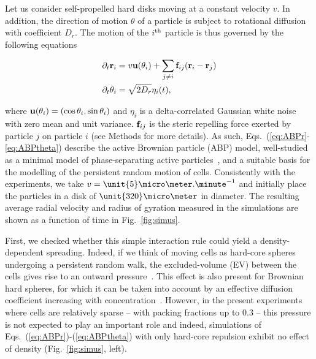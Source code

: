 \documentclass[11pt, twocolumn]{article}
\renewcommand\vec[1]{{\bf #1}}
\begin{document}
Let us consider self-propelled hard disks moving at a constant velocity
$v$. In addition, the direction of motion $\theta$ of a particle is
subject to rotational diffusion with coefficient $D_r$. The motion of
the $i^{\rm th}$ particle is thus governed by the following equations
\begin{linenomath}
\begin{align}
\label{eq:ABPr}\partial_{t}\vec r_i &= v\vec u(\theta_i)+\sum_{j\neq i}\vec f_{ij}(\vec r_i-\vec r_j)\\
\label{eq:ABPtheta}\partial_{t}\theta_i &= \sqrt{2D_r}\eta_i(t),
\end{align}
\end{linenomath}
where $\vec u(\theta_i)=(\cos \theta_i,\sin\theta_i)$ and $\eta_{i}$
is a delta-correlated Gaussian white noise with zero mean and unit
variance. $\vec f_{ij}$ is the steric repelling force exerted by
particle $j$ on particle $i$ (see Methods for more details). As such,
Eqs.~(\ref{eq:ABPr}-\ref{eq:ABPtheta}) describe the active Brownian
particle (ABP) model, well-studied as a minimal model of
phase-separating active particles~\cite{Fily2012,Solon2015}, and a
suitable basis for the modelling of the persistent random motion of
cells. Consistently with the experiments, we take
$v=\unit{5}\micro\meter.\minute^{-1}$ and initially place the particles in
a disk of $\unit{320}\micro\meter$ in diameter. The resulting average
radial velocity and radius of gyration measured in the simulations are
shown as a function of time in Fig.~\ref{fig:simus}.

First, we checked whether this simple interaction rule could yield a
density-dependent spreading. Indeed, if we think of moving cells as
hard-core spheres undergoing a persistent random walk, the
excluded-volume (EV) between the cells gives rise to an outward
pressure~\cite{Solon2015}. This effect is also present for Brownian
hard spheres, for which it can be taken into account by an effective
diffusion coefficient increasing with
concentration~\cite{BrunaChapman}. However, in the present experiments
where cells are relatively sparse -- with packing fractions up to
$0.3$ -- this pressure is not expected to play an important role and
indeed, simulations of Eqs.~(\ref{eq:ABPr})-(\ref{eq:ABPtheta}) with
only hard-core repulsion exhibit no effect of density
(Fig.~\ref{fig:simus}, left).
  
\end{document}
